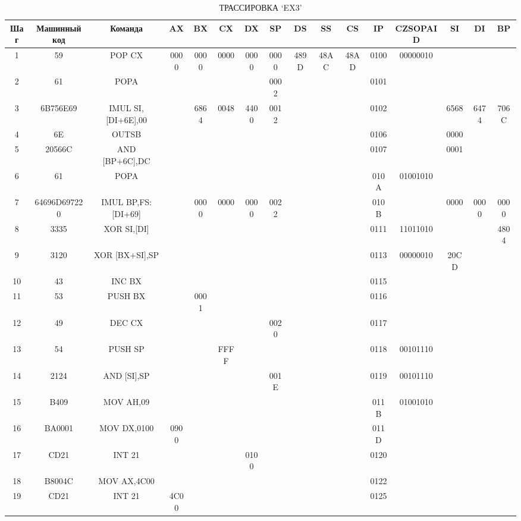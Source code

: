 \documentclass{report}
\begin{document}
 \begin{table}[h!]
	\begin{tabular}{|c|c|c|c|c|c|c|c|c|c|c|c|c|c|c|c|}
	\hline
Шаг & Машинный код & Команда & AX & BX & CX & DX & SP & DS & SS & CS & IP & CZSOPAID & SI & DI & BP \\
	\hline
1 & 59 & POP CX & 0000 & 0000 & 0000 & 0000 & 0000 & 489D & 48AC & 48AD & 0100 & 00000010 & & & \\
  	\hline
2 & 61 & POPA &  &  &  &  & 0002 &  &  &  & 0101 & & & & \\
  	\hline
3 & 6B756E69 & IMUL SI,[DI+6E],00 &  & 6864 & 0048 & 4400 & 0012 &  &  &  & 0102 & & 6568 & 6474 & 706C \\
  	\hline
4 & 6E & OUTSB &  &  &  &  &  &  &  &  & 0106 & & 0000 &  &  \\
  	\hline
5 & 20566C & AND [BP+6C],DC &  &  &  &  &  &  &  &  & 0107 & & 0001 &  &  \\
  	\hline
6 & 61 & POPA &  &  &  &  &  &  &  &  & 010A & 01001010 &  &  &  \\
  	\hline
7 & 64696D697220 & IMUL BP,FS:[DI+69] &  & 0000 & 0000 & 0000 & 0022 &  &  &  & 010B &  & 0000 & 0000 & 0000 \\
  	\hline  	
8 & 3335 & XOR SI,[DI] &  &  &  &  &  &  &  &  & 0111 & 11011010 &  &  & 4804 \\
  	\hline  	
9 & 3120 & XOR [BX+SI],SP &  &  &  &  &  &  &  &  & 0113 & 00000010 & 20CD &  &  \\
  	\hline  
10 & 43 & INC BX &  &  &  &  &  &  &  &  & 0115 &  &  &  &  \\
  	\hline   	
 11 & 53 & PUSH BX &  & 0001 &  &  &  &  &  &  & 0116 &  &  &  &  \\
  	\hline   	
 12 & 49 & DEC CX &  &  &  &  & 0020 &  &  &  & 0117 &  &  &  &  \\
  	\hline   	
  13 & 54 & PUSH SP &  &  & FFFF &  &  &  &  &  & 0118 & 00101110 &  &  &  \\
  	\hline   	
14 & 2124 & AND [SI],SP &  &  &  &  & 001E &  &  &  & 0119 & 00101110 &  &  &  \\
  	\hline  
15 & B409 & MOV AH,09 &  &  &  &  &  &  &  &  & 011B & 01001010 &  &  &  \\
  	\hline  
 16 & BA0001 & MOV DX,0100 & 0900 &  &  &  &  &  &  &  & 011D &  &  &  &  \\
  	\hline  
17 & CD21 & INT 21 &  &  &  & 0100 &  &  &  &  & 0120 &  &  &  &  \\
  	\hline  
18 & B8004C & MOV AX,4C00 &  &  &  &  &  &  &  &  & 0122 &  &  &  &  \\
  	\hline  
 19 & CD21 & INT 21 & 4C00 &  &  &  &  &  &  &  & 0125 &  &  &  &  \\
  	\hline   	
  	\end{tabular}
	\caption{ТРАССИРОВКА `EX3'}\label{tab3}
\end{table}
\end{document}

